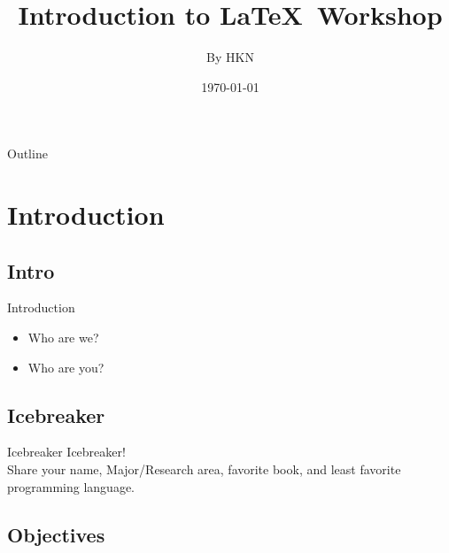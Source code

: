 \documentclass{beamer}
\title{Introduction to \LaTeX\ Workshop}
\author[HKN] %
{By HKN}
\date[Short Occasion] %
{\today}
\begin{document}
\begin{frame}
  \titlepage
\end{frame}

\begin{frame}{Outline}
  \tableofcontents
\end{frame}




\section{Introduction}

\subsection[Intro]{Intro}

\begin{frame}{Introduction}

  \begin{itemize}
  \item
   	Who are we?
	\pause
  \item
   	Who are you? 
  \end{itemize}
\end{frame}

\subsection[Icebreaker]{Icebreaker}
\begin{frame}{Icebreaker}
	Icebreaker!\\
	Share your name, Major/Research area, favorite book, and least favorite programming language. 
\end{frame}

\subsection[Objectives]{Objectives}
\end{document}
